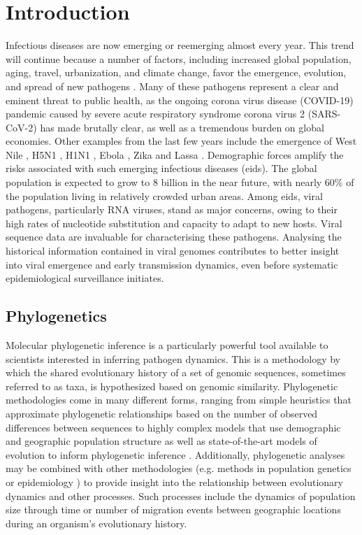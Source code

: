\chapter{Introduction}\label{ch:introduction}

Infectious diseases are now emerging or reemerging almost every year.
This trend will continue because a number of factors, including increased global population, aging, travel, urbanization, and climate change, favor the emergence, evolution, and spread of new pathogens \cite{bloom2017emerging}.
Many of these pathogens represent a clear and eminent threat to public health, as the ongoing corona virus disease (COVID-19) pandemic caused by severe acute respiratory syndrome corona virus 2 (SARS-CoV-2) has made brutally clear, as well as a tremendous burden on global economies.
Other examples from the last few years include the emergence of West Nile \cite{hadfield2019twenty}, H5N1 \cite{imai2018diversity}, H1N1 \cite{bedford2015global}, Ebola \cite{dudas2017virus}, Zika \cite{fauci2016zika, faria2016zika} and Lassa \cite{kafetzopoulou2019metagenomic}.
Demographic forces amplify the risks associated with such emerging infectious diseases (\gls{eids}).
The global population is expected to grow to 8 billion in the near future, with nearly 60\% of the population living in relatively crowded urban areas.
Among \gls{eids}, viral pathogens, particularly RNA viruses, stand as major concerns, owing to their high rates of nucleotide substitution and capacity to adapt to new hosts.
Viral sequence data are invaluable for characterising these pathogens.
Analysing the historical information contained in viral genomes contributes to better insight into viral emergence and early transmission dynamics, even before systematic epidemiological surveillance initiates.

\section{Phylogenetics}

Molecular phylogenetic inference is a particularly powerful tool available to scientists interested in inferring pathogen dynamics.
This is a methodology by which the shared evolutionary history of a set of genomic sequences, sometimes referred to as taxa, is hypothesized based on genomic similarity.
Phylogenetic methodologies come in many different forms, ranging from simple heuristics that approximate phylogenetic relationships based on the number of observed differences between sequences \cite{felsenstein2003inferring} to highly complex models that use demographic and geographic population structure as well as state-of-the-art models of evolution to inform phylogenetic inference \cite{dudas2018mers}.
Additionally, phylogenetic analyses may be combined with other methodologies (e.g. methods in population genetics \cite{felsenstein2003inferring} or epidemiology \cite{black2020ten}) to provide insight into the relationship between evolutionary dynamics and other processes.
Such processes include the dynamics of population size through time or number of migration events between geographic locations during an organism's evolutionary history.

